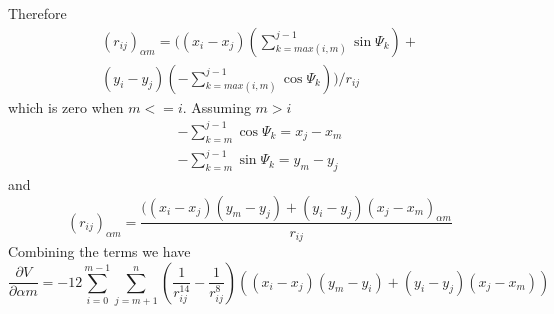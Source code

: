 \documentclass[conference,letterpaper]{IEEEtran}
\begin{document}
Therefore
\begin{equation}
    \begin{split}
        (r_{ij})_{\alpha m} = ((x_{i}-x_{j})(\sum_{k=max(i,m)}^{j-1}\sin{\Psi_{k}}) +\\
        (y_{i}-y_{j})(-\sum_{k=max(i, m)}^{j-1}\cos{\Psi_{k}}))/r_{ij}
    \end{split}
\end{equation}
which is zero when $m <= i$. Assuming $m > i$
\begin{equation}
    \begin{split}
        -\sum_{k=m}^{j-1}\cos{\Psi_{k}}=x_{j}-x_{m} \\
        -\sum_{k=m}^{j-1}\sin{\Psi_{k}}=y_{m}-y_{j}
    \end{split}
\end{equation}
and
\begin{equation}
    (r_{ij})_{\alpha m} = \frac{((x_{i} - x_{j})(y_{m} - y_{j}) + (y_{i} - y_{j})(x_{j} - x_{m})_{\alpha m}}{r_{ij}}
\end{equation}
Combining the terms we have
\begin{equation}
    \frac{\partial V}{\partial \alpha m} = -12 \sum_{i=0}^{m-1}\sum_{j=m+1}^{n}(\frac{1}{r_{ij}^{14}} - \frac{1}{r_{ij}^{8}})((x_{i}-x_{j})(y_{m}-y_{i})+(y_{i}-y_{j})(x_{j}-x_{m}))
\end{equation}
%
%
\end{document}

